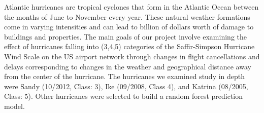
Atlantic hurricanes are tropical cyclones that form in the Atlantic Ocean between the months of June to November every year. These natural weather formations come in varying intensities and can lead to billion of dollars worth of damage to buildings and properties. The main goals of our project involve examining the effect of hurricanes falling into (3,4,5) categories of the Saffir-Simpson Hurricane Wind Scale on the US airport network through changes in flight cancellations and delays corresponding to changes in the weather and geographical distance away from the center of the hurricane. The hurricanes we examined study in depth were Sandy (10/2012, Class: 3), Ike (09/2008, Class 4), and Katrina (08/2005, Class: 5). Other hurricanes were selected to build a random forest prediction model. 